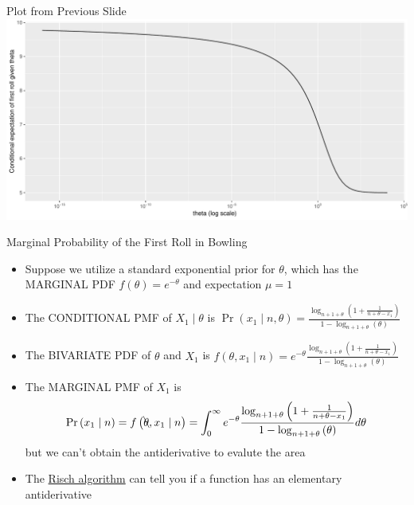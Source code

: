 \documentclass[
  ignorenonframetext,
]{beamer}
\providecommand{\tightlist}{%
  \setlength{\itemsep}{0pt}\setlength{\parskip}{0pt}}
\begin{document}
\begin{frame}{Plot from Previous Slide}
\protect\hypertarget{plot-from-previous-slide}{}
\includegraphics{Slides04_files/figure-beamer/unnamed-chunk-10-1.pdf}
\end{frame}

\begin{frame}{Marginal Probability of the First Roll in Bowling}
\protect\hypertarget{marginal-probability-of-the-first-roll-in-bowling}{}
\begin{itemize}
\tightlist
\item
  Suppose we utilize a standard exponential prior for \(\theta\), which
  has the MARGINAL PDF \(f\left(\theta\right) = e^{-\theta}\) and
  expectation \(\mu = 1\)
\item
  The CONDITIONAL PMF of \(X_1 \mid \theta\) is
  \(\Pr\left(x_1 \mid n, \theta\right) = \frac{\log_{n + 1 + \theta}\left(1 + \frac{1} {n + \theta - x_1}\right)}{1 - \log_{n + 1 + \theta}\left(\theta\right)}\)
\item
  The BIVARIATE PDF of \(\theta\) and \(X_1\) is
  \(f\left(\theta, x_1 \mid n\right) = e^{-\theta} \frac{\log_{n + 1 + \theta}\left(1 + \frac{1}{n + \theta - x_1}\right)}{1 - \log_{n + 1 + \theta}\left(\theta\right)}\)
\item
  The MARGINAL PMF of \(X_1\) is
  \[\Pr\left(x_1 \mid n\right) = f\left(\bcancel{\theta}, x_1 \mid n\right) = 
  \int_0^\infty e^{-\theta} \frac{\log_{n + 1 + \theta}\left(1 + \frac{1}{n + \theta - x_1}\right)}
  {1 - \log_{n + 1 + \theta}\left(\theta\right)}d\theta\] but we can't
  obtain the antiderivative to evalute the area
\end{itemize}

\begin{itemize}[<+->]
\tightlist
\item
  The \href{https://en.wikipedia.org/wiki/Risch_algorithm}{Risch
  algorithm} can tell you if a function has an elementary antiderivative
\end{itemize}
\end{frame}
\end{document}
